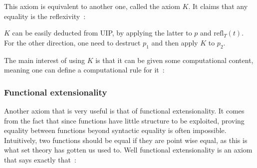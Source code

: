 \begin{center}\begin{prooftree}
     
     
\end{prooftree}\end{center}

This axiom is equivalent to another one, called the axiom $K$. It claims that
any equality is the reflexivity~:

\begin{center}\begin{prooftree}
     
\end{prooftree}\end{center}

$K$ can be easily deducted from UIP, by applying the latter to $p$ and
$\text{refl}_{T}(t)$. For the other direction, one need to destruct $p_{1}$ and
then apply $K$ to $p_{2}$.

The main interest of using $K$ is that it can be given some computational
content, meaning one can define a computational rule for it~:

\begin{center}\begin{prooftree}
\end{prooftree}\end{center}

\subsubsection{Functional extensionality}\label{funext}

Another axiom that is very useful is that of functional extensionality. It comes
from the fact that since functions have little structure to be exploited,
proving equality between functions beyond syntactic equality is often
impossible. Intuitively, two functions should be equal if they are point wise
equal, as this is what set theory has gotten us used to. Well functional
extensionality is an axiom that says exactly that~:

\begin{center}\begin{prooftree}
\end{prooftree}\end{center}

